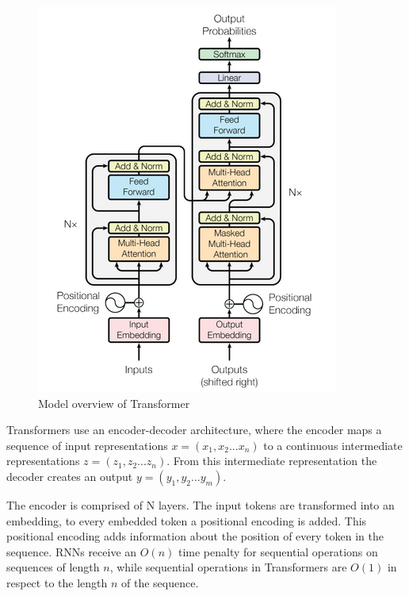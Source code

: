 \label{fig:transformers}
\begin{figure}[H]
  \centering
  \includegraphics[width=\linewidth]{img/transformers.png}
  \caption{Model overview of Transformer \cite{Transformers}}
\end{figure}

Transformers use an encoder-decoder architecture, where the encoder maps a sequence of input representations \(x = (x_1,x_2 ... x_n)\) to a continuous intermediate representations \(z = (z_1,z_2 ... z_n)\). From this intermediate representation the decoder creates an output \(y = (y_1,y_2 ... y_m)\).

The encoder is comprised of N layers. The input tokens are transformed into an embedding, to every embedded token a positional encoding is added. This positional encoding adds information about the position of every token in the sequence. RNNs receive an \(O(n)\) time penalty for sequential operations on sequences of length \(n\), while sequential operations in Transformers are \(O(1)\) in respect to the length \(n\) of the sequence.

